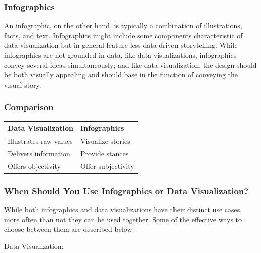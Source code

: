 \documentclass[]{book}
\begin{document}
\hypertarget{infographics}{%
\subsubsection{Infographics}\label{infographics}}

An infographic, on the other hand, is typically a combination of illustrations, facts, and text. Infographics might include some components characteristic of data visualization but in general feature less data-driven storytelling. While infographics are not grounded in data, like data visualizations, infographics convey several ideas simultaneously; and like data visualization, the design should be both visually appealing and should base in the function of conveying the visual story.

\hypertarget{comparison}{%
\subsubsection{Comparison}\label{comparison}}

\begin{longtable}[]{@{}ll@{}}
\toprule
Data Visualization & Infographics\tabularnewline
\midrule
\endhead
Illustrates raw values & Visualize stories\tabularnewline
Delivers information & Provide stances\tabularnewline
Offers objectivity & Offer subjectivity\tabularnewline
\bottomrule
\end{longtable}

\hypertarget{when-should-you-use-infographics-or-data-visualization}{%
\subsubsection{When Should You Use Infographics or Data Visualization?}\label{when-should-you-use-infographics-or-data-visualization}}

While both infographics and data visualizations have their distinct use cases, more often than not they can be used together. Some of the effective ways to choose between them are described below.

Data Visualization:
\end{document}
